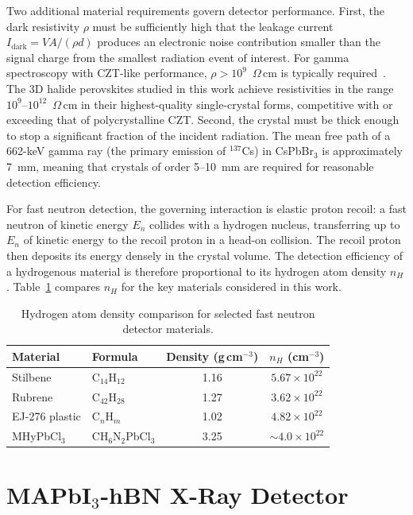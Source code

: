 Two additional material requirements govern detector performance.
First, the dark resistivity $\rho$ must be sufficiently high that
the leakage current $I_{\mathrm{dark}} = V\!A/(\rho d)$ produces an
electronic noise contribution smaller than the signal charge from
the smallest radiation event of interest.  For gamma spectroscopy
with CZT-like performance,
$\rho > 10^{9}$~$\Omega$\,cm is typically
required~\cite{Luke1995}.  The 3D halide perovskites studied in
this work achieve resistivities in the range
$10^{9}$--$10^{12}$~$\Omega$\,cm in their highest-quality
single-crystal forms, competitive with or exceeding that of
polycrystalline CZT.  Second, the crystal must be thick enough to
stop a significant fraction of the incident radiation.  The mean
free path of a 662-keV gamma ray (the primary emission of
$^{137}$Cs) in CsPbBr$_3$ is approximately 7~mm, meaning that
crystals of order 5--10~mm are required for reasonable detection
efficiency.

For fast neutron detection, the governing interaction is elastic
proton recoil: a fast neutron of kinetic energy $E_n$ collides
with a hydrogen nucleus, transferring up to $E_n$ of kinetic
energy to the recoil proton in a head-on collision.  The recoil
proton then deposits its energy densely in the crystal volume.
The detection efficiency of a hydrogenous material is therefore
proportional to its hydrogen atom density $n_H$.
Table~\ref{tab:h_density} compares $n_H$ for the key materials
considered in this work.

\begin{table}[htbp]
\centering
\caption{Hydrogen atom density comparison for selected fast neutron detector materials.}
\label{tab:h_density}
\begin{tabular}{llcc}
\hline
Material & Formula & Density (g\,cm$^{-3}$) & $n_H$ (cm$^{-3}$) \\
\hline
Stilbene          & C$_{14}$H$_{12}$    & 1.16 & $5.67\times10^{22}$ \\
Rubrene           & C$_{42}$H$_{28}$    & 1.27 & $3.62\times10^{22}$ \\
EJ-276 plastic    & C$_n$H$_m$          & 1.02 & $4.82\times10^{22}$ \\
MHyPbCl$_3$       & CH$_6$N$_2$PbCl$_3$ & 3.25 & $\sim4.0\times10^{22}$ \\
\hline
\end{tabular}
\end{table}


\section{MAPbI$_3$-hBN X-Ray Detector}
\label{sec:mapbi_hbn_xray}

